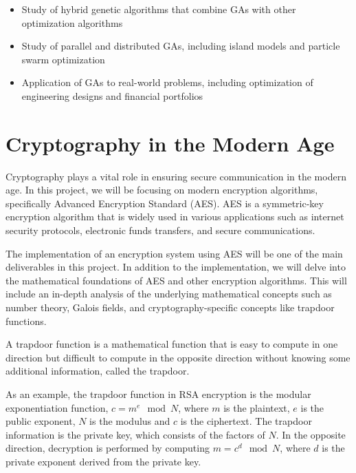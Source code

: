 \documentclass{article}
\begin{document}
    \begin{itemize}
    \item Study of hybrid genetic algorithms that combine GAs with other optimization algorithms
    \item Study of parallel and distributed GAs, including island models and particle swarm optimization
    \item Application of GAs to real-world problems, including optimization of engineering designs and financial portfolios
    \end{itemize}

\pagebreak

\section{Cryptography in the Modern Age}
    Cryptography plays a vital role in ensuring secure communication in the modern age. In this project, we will be focusing on modern encryption algorithms, specifically Advanced Encryption Standard (AES). AES is a symmetric-key encryption algorithm that is widely used in various applications such as internet security protocols, electronic funds transfers, and secure communications.
    
    \vspace{3mm}
    The implementation of an encryption system using AES will be one of the main deliverables in this project. In addition to the implementation, we will delve into the mathematical foundations of AES and other encryption algorithms. This will include an in-depth analysis of the underlying mathematical concepts such as number theory, Galois fields, and cryptography-specific concepts like trapdoor functions.

    \vspace{3mm}
    A trapdoor function is a mathematical function that is easy to compute in one direction but difficult to compute in the opposite direction without knowing some additional information, called the trapdoor.

    \vspace{3mm}
    As an example, the trapdoor function in RSA encryption is the modular exponentiation function, $c = m^e \mod N$, where $m$ is the plaintext, $e$ is the public exponent, $N$ is the modulus and $c$ is the ciphertext. The trapdoor information is the private key, which consists of the factors of $N$. In the opposite direction, decryption is performed by computing $m = c^d \mod N$, where $d$ is the private exponent derived from the private key.
\end{document}
